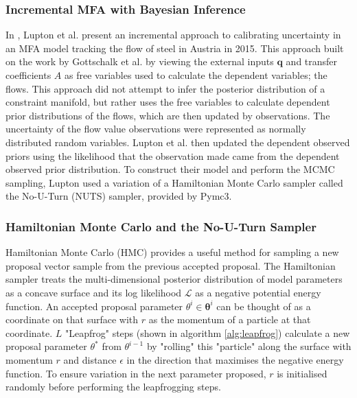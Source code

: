 \documentclass[ %
                    author={Tom Jager},
                supervisor={Dr. Daniel Schien},
                    degree={MEng},
                     title={A Bayesian Inference Engine for Calibrating Uncertainty over UMIS Structured MFA Systems},
                  subtitle={},
                      type={research},
                      year={2019} ]{dissertation}
\begin{document}
\subsubsection{Incremental MFA with Bayesian Inference}
In \cite{lupton2018incremental}, Lupton et al. present an incremental approach to calibrating uncertainty in an MFA model tracking the flow of steel in Austria in 2015. This approach built on the work by Gottschalk et al. by viewing the external inputs $\bm{q}$ and transfer coefficients $A$ as free variables used to calculate the dependent variables; the flows. This approach did not attempt to infer the posterior distribution of a constraint manifold, but rather uses the free variables to calculate dependent prior distributions of the flows, which are then updated by observations. The uncertainty of  the flow value observations were represented as normally distributed random variables. Lupton et al. then updated the dependent observed priors using the likelihood that the observation made came from the dependent observed prior distribution. To construct their model and perform the MCMC sampling, Lupton used a variation of a Hamiltonian Monte Carlo sampler called the No-U-Turn (NUTS) sampler, provided by Pymc3.


\subsubsection{Hamiltonian Monte Carlo and the No-U-Turn Sampler}
Hamiltonian Monte Carlo (HMC) \cite{betancourt2017conceptual} provides a useful method for sampling a new proposal vector sample from the previous accepted proposal. The Hamiltonian sampler treats the multi-dimensional posterior distribution of model parameters as a concave surface and its log likelihood $\mathcal{L}$ as a negative potential energy function. An accepted proposal parameter $\theta^i \in \bm{\theta}^i$ can be thought of as a coordinate on that surface with $r$ as the momentum of a particle at that coordinate. $L$ "Leapfrog" steps (shown in algorithm \ref{alg:leapfrog}) calculate a new proposal parameter $\theta^{*}$ from $\theta^{i-1}$ by "rolling" this "particle" along the surface with momentum $r$ and distance $\epsilon$ in the direction that maximises the negative energy function. To ensure variation in the next parameter proposed, $r$ is initialised randomly before performing the leapfrogging steps.
\end{document}
